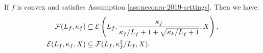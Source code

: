 \documentclass[12pt]{report}
\begin{document}
            \begin{theorem}\label{thm:qfg-peb-equiv}
                If $f$ is convex and satisfies Assumption \ref{ass:necoara-2019-settings}. 
                Then we have: 
                \begin{align*}
                    \mathcal F (L_f, \kappa_f) 
                    &\subseteq 
                    \mathcal E\left(
                        L_f,
                        \frac{\kappa_f}{\kappa_f/L_f + 1 + \sqrt{\kappa_k/L_f + 1}}, 
                        X
                    \right), 
                    \\
                    \mathcal E (L_f, \kappa_f, X) &\subseteq \mathcal F(L_f, \kappa^2_f/L_f, X). 
                \end{align*}
            \end{theorem}
\end{document}
